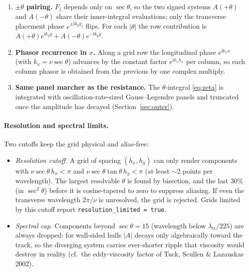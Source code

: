 \documentclass[11pt]{article}
\newcommand{\ii}{\mathrm{i}}
\begin{document}
\begin{enumerate}
  \item \textbf{$\pm\theta$ pairing.} $F_j$ depends only on $\sec\theta$, so the
        two signed systems $A(+\theta)$ and $A(-\theta)$ share their inner-integral
        evaluations; only the transverse placement phase $e^{\pm\ii k_y y_j}$
        flips. For each $|\theta|$ the row contribution is
        $A(+\theta)e^{\ii k_y y} + A(-\theta)e^{-\ii k_y y}$.
  \item \textbf{Phasor recurrence in $x$.} Along a grid row the longitudinal
        phase $e^{\ii k_x x}$ (with $k_x = \nu\sec\theta$) advances by the constant
        factor $e^{\ii k_x h_x}$ per column, so each column phasor is obtained
        from the previous by one complex multiply.
  \item \textbf{Same panel marcher as the resistance.} The $\theta$-integral
        \eqref{eq:zeta} is integrated with oscillation-rate-sized Gauss--Legendre
        panels and truncated once the amplitude has decayed
        (Section~\ref{sec:outer}).
\end{enumerate}

\paragraph{Resolution and spectral limits.} Two cutoffs keep the grid physical
and alias-free:
\begin{itemize}
  \item \emph{Resolution cutoff.} A grid of spacing $(h_x, h_y)$ can only render
        components with $\nu\sec\theta\,h_x < \pi$ and
        $\nu\sec\theta\tan\theta\,h_y < \pi$ (at least $\sim$2 points per
        wavelength). The largest resolvable $\theta$ is found by bisection, and
        the last $30\%$ (in $\sec^2\theta$) before it is cosine-tapered to zero to
        suppress aliasing. If even the transverse wavelength $2\pi/\nu$ is
        unresolved, the grid is rejected. Grids limited by this cutoff report
        \texttt{resolution\_limited = true}.
  \item \emph{Spectral cap.} Components beyond $\sec\theta = 15$ (wavelength below
        $\lambda_{\mathrm{tr}}/225$) are always dropped: for wall-sided hulls
        $|A|$ decays only algebraically toward the track, so the diverging system
        carries ever-shorter ripple that viscosity would destroy in reality (cf.\
        the eddy-viscosity factor of Tuck, Scullen \& Lazauskas 2002).
\end{itemize}
\end{document}
